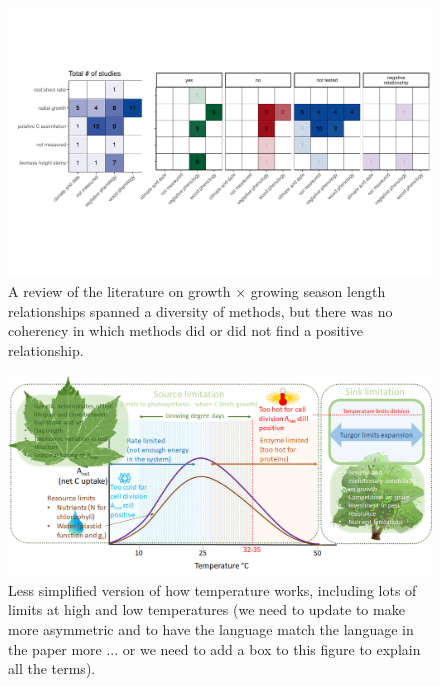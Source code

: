 \documentclass[11pt]{article}
\begin{document}
\clearpage
\begin{figure}[h!]
\includegraphics[width=1\textwidth]{..//figures/heatmaps/combinedheatmap_gslxgrowth_simple.pdf}
\caption{A review of the literature on growth $\times$ growing season length relationships spanned a diversity of methods, but there was no coherency in which methods did or did not find a positive relationship.}
\label{fig:heatmaps}
\end{figure}

\clearpage
\begin{figure}[h!]
\includegraphics[width=1\textwidth]{..//figures/grephonfig.png}
\caption{Less simplified version of how temperature works, including lots of limits at high and low temperatures (we need to update to make more asymmetric and to have the language match the language in the paper more ... or we need to add a box to this figure to explain all the terms).}
\label{fig:temperaturecomplex}
\end{figure}
\end{document}
